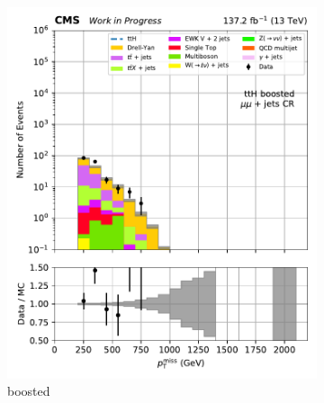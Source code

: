 \begin{figure}[htbp]
    \centering
    \begin{subfigure}[b]{0.24\textwidth}
        \includegraphics[width=\textwidth]{figures/region_plots/2016to18/region_2/ttH_boosted.pdf}
        \caption{\ttH boosted}
    \end{subfigure}
    \hfill
    \begin{subfigure}[b]{0.24\textwidth}

\end{subfigure}
\end{figure}
